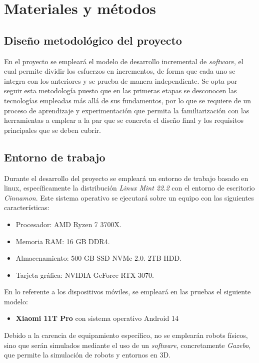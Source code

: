 \chapter{Materiales y métodos} \label{chapter:materiales_metodos}

\section{Diseño metodológico del proyecto}
En el proyecto se empleará el modelo de desarrollo incremental de \textit{software}, el cual permite dividir los esfuerzos en incrementos, 
de forma que cada uno se integra con los anteriores y se prueba de manera independiente. Se opta por seguir esta metodología
puesto que en las primeras etapas se desconocen las tecnologías empleadas más allá de sus fundamentos, por lo que se requiere de 
un proceso de aprendizaje y experimentación que permita la familiarización con las herramientas a emplear a la par que se 
concreta el diseño final y los requisitos principales que se deben cubrir.

\section{Entorno de trabajo}
Durante el desarrollo del proyecto se empleará un entorno de trabajo basado en linux, específicamente la 
distribución \textit{Linux Mint 22.2} con el entorno de escritorio \textit{Cinnamon}. 
Este sistema operativo se ejecutará sobre un equipo con las siguientes características:
\begin{itemize}
    \item Procesador: AMD Ryzen 7 3700X.
    \item Memoria RAM: 16 GB DDR4.
    \item Almacenamiento: 500 GB SSD NVMe 2.0. 2TB HDD.
    \item Tarjeta gráfica: NVIDIA GeForce RTX 3070.
\end{itemize}

En lo referente a los dispositivos móviles, se empleará en las pruebas el siguiente modelo:
\begin{itemize}
    \item \textbf{Xiaomi 11T Pro} con sistema operativo Android 14
\end{itemize}

Debido a la carencia de equipamiento específico, no se emplearán robots físicos, sino que serán simulados mediante el uso de un \textit{software}, 
concretamente \textit{Gazebo}, que permite la simulación de robots y entornos en 3D.

